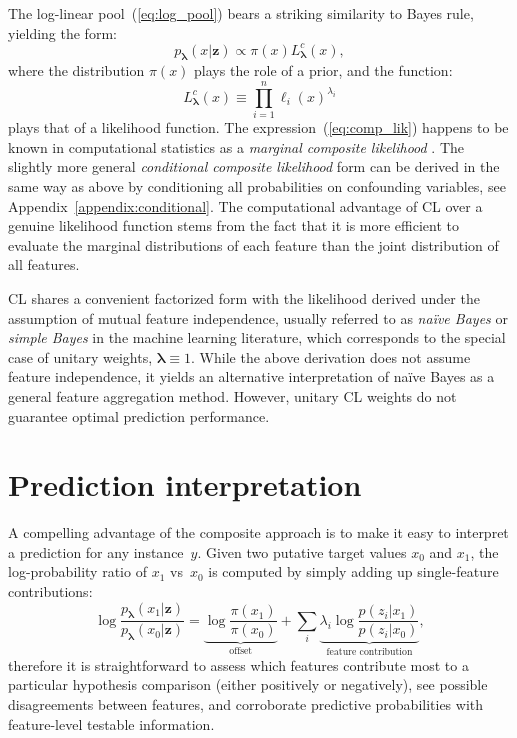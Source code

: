 \documentclass[english]{scrartcl}
\def\y{{\mathbf{y}}}
\def\y{{\mathbf{z}}}
\newcommand{\blambda}{{\boldsymbol{\lambda}}}
\begin{document}
The log-linear pool~(\ref{eq:log_pool}) bears a striking similarity to Bayes rule, yielding  the form: 
$$
p_\blambda(x|\y)\propto \pi(x) L^c_\blambda(x),
$$
where the distribution $\pi(x)$ plays the role of a prior, and the function:
\begin{equation}
\label{eq:comp_lik}
L^c_\blambda(x) \equiv \prod_{i=1}^n \ell_i (x)^{\lambda_i}
\end{equation} 
plays that of a likelihood function. The expression~(\ref{eq:comp_lik}) happens to be known in computational statistics as a {\em marginal composite likelihood} \cite{Varin-11}. The slightly more general {\em conditional composite likelihood} form can be derived in the same way as above by conditioning all probabilities on confounding variables, see Appendix~\ref{appendix:conditional}. The computational advantage of CL over a genuine likelihood function stems from the fact that it is more efficient to evaluate the marginal distributions of each feature than the joint distribution of all features.

CL shares a convenient factorized form with the likelihood derived under the assumption of mutual feature independence, usually referred to as {\em na\"ive Bayes} or {\em simple Bayes} in the machine learning literature, which corresponds to the special case of unitary weights, $\blambda\equiv 1$. While the above derivation does not assume feature independence, it yields an alternative interpretation of na\"ive Bayes as a general feature aggregation method. However, unitary CL weights do not guarantee optimal prediction performance.


\section{Prediction interpretation}

A compelling advantage of the composite approach is to make it easy to interpret a prediction for any instance~$y$. Given two putative target values $x_0$ and $x_1$, the log-probability ratio of $x_1$ vs~$x_0$ is computed by simply adding up single-feature contributions: 
$$
\log \frac{p_\blambda(x_1|\y)}{p_\blambda(x_0|\y)}
= 
\underbrace{\log \frac{\pi(x_1)}{\pi(x_0)}}_{\text{offset}}
+ \sum_i \underbrace{\lambda_i \log \frac{p(z_i|x_1)}{p(z_i|x_0)}}_{\text{feature contribution}},
$$
therefore it is straightforward to assess which features contribute most to a particular hypothesis comparison (either positively or negatively), see possible disagreements between features, and corroborate predictive probabilities with feature-level testable information. 
\end{document}
